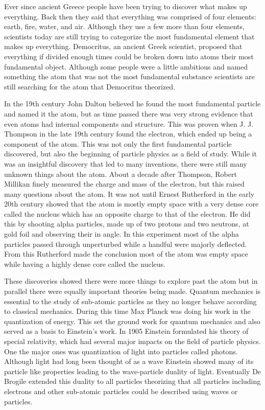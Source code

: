 Ever since ancient Greece people have been trying to discover what makes up everything. Back then they said that everything was comprised of four elements: earth, fire, water, and air. Although they use a few more than four elements, scientists today are still trying to categorize the most fundamental element that makes up everything. Democritus, an ancient Greek scientist, proposed that everything if divided enough times could be broken down into atoms their most fundamental object. Although some people were a little ambitious and named something the atom that was not the most fundamental substance scientists are still searching for the atom that Democritus theorized. 

In the 19th century John Dalton believed he found the most fundamental particle and named it the atom, but as time passed there was very strong evidence that even atoms had internal components and structure. This was proven when J. J. Thompson in the late 19th century found the electron, which ended up being a component of the atom. This was not only the first fundamental particle discovered, but also the beginning of particle physics as a field of study. While it was an insightful discovery that led to many inventions, there were still many unknown things about the atom. About a decade after Thompson, Robert Millikan finely measured the charge and mass of the electron, but this raised many questions about the atom. It was not until Ernest Rutherford in the early 20th century showed that the atom is mostly empty space with a very dense core called the nucleus which has an opposite charge to that of the electron. He did this by shooting alpha particles, made up of two protons and two neutrons, at gold foil and observing their in angle. In this experiment most of the alpha particles passed through unperturbed while a handful were majorly deflected. From this Rutherford made the conclusion most of the atom was empty space while having a highly dense core called the nucleus. 

These discoveries showed there were more things to explore past the atom but in parallel there were equally important theories being made. Quantum mechanics is essential to the study of sub-atomic particles as they no longer behave according to classical mechanics. During this time Max Planck was doing his work in the quantization of energy. This set the ground work for quantum mechanics and also served as a basis to Einstein's work. In 1905 Einstein formulated his theory of special relativity, which had several major impacts on the field of particle physics. One the major ones was quantization of light into particles called photons. Although light had long been thought of as a wave Einstein showed many of its particle like properties leading to the wave-particle duality of light. Eventually De Brogile extended this duality to all particles theorizing that all particles including electrons and other sub-atomic particles could be described using waves or particles.

